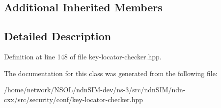 \subsection*{Additional Inherited Members}


\subsection{Detailed Description}


Definition at line 148 of file key-\/locator-\/checker.\+hpp.



The documentation for this class was generated from the following file\+:\begin{DoxyCompactItemize}
\item 
/home/network/\+N\+S\+O\+L/ndn\+S\+I\+M-\/dev/ns-\/3/src/ndn\+S\+I\+M/ndn-\/cxx/src/security/conf/key-\/locator-\/checker.\+hpp\end{DoxyCompactItemize}
